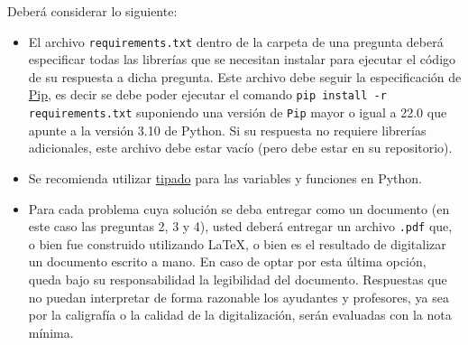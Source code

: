 
\bigskip

Deberá considerar lo siguiente:

\begin{itemize}

  \item El archivo \texttt{requirements.txt} dentro de la carpeta de una pregunta deberá especificar todas las librerías que se necesitan instalar para ejecutar el código de su respuesta a dicha pregunta. Este archivo debe seguir la especificación de \href{https://pypi.org/project/pip/}{Pip}, es decir se debe poder ejecutar el comando \texttt{pip install -r requirements.txt} suponiendo una versión de \texttt{Pip} mayor o igual a 22.0 que apunte a la versión 3.10 de Python. Si su respuesta no requiere librerías adicionales, este archivo debe estar vacío (pero debe estar en su repositorio).

  \item Se recomienda utilizar \href{https://docs.python.org/3.10/library/typing.html}{tipado} para las variables y funciones en Python.

  \item Para cada problema cuya solución se deba entregar como un documento (en este caso las preguntas 2, 3 y 4), usted deberá entregar un archivo \texttt{.pdf} que, o bien fue construido utilizando \LaTeX, o bien es el resultado de digitalizar un documento escrito a mano. En caso de optar por esta última opción, queda bajo su responsabilidad la legibilidad del documento. Respuestas que no puedan interpretar de forma razonable los ayudantes y profesores, ya sea por la caligrafía o la calidad de la digitalización, serán evaluadas con la nota mínima.

\end{itemize}

